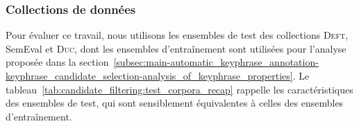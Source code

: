       \subsubsection{Collections de données}
      \label{subsubsec:main-automatic_keyphrase_annotation-keyphrase_candidate_selection-evaluation-evaluation_data}
        Pour évaluer ce travail, nous utilisons les ensembles de test des
        collections \textsc{Deft}, SemEval et \textsc{Duc}, dont les ensembles
        d'entraînement sont utilisées pour l'analyse proposée dans la
        section~\ref{subsec:main-automatic_keyphrase_annotation-keyphrase_candidate_selection-analysis_of_keyphrase_properties}.
        Le tableau~\ref{tab:candidate_filtering:test_corpora_recap} rappelle les
        caractéristiques des ensembles de test, qui sont sensiblement
        équivalentes à celles des ensembles d'entraînement.
        \begin{table}[!h]
          \centering

          \caption{Rappel des corpus utilisés pour évaluer la sélection des
                   candidats
                   \label{tab:candidate_filtering:test_corpora_recap}}
        \end{table}

